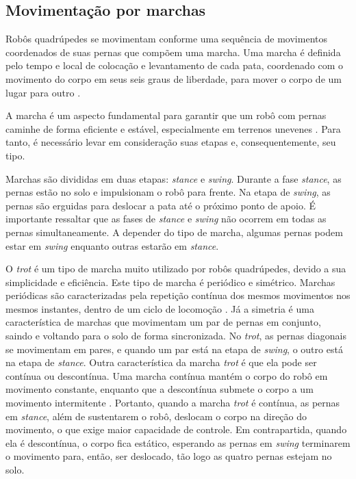 \documentclass[conference]{IEEEtran}
\begin{document}
\subsection{Movimentação por marchas}
Robôs quadrúpedes se movimentam conforme uma sequência de movimentos coordenados de suas pernas que compõem uma marcha. Uma marcha é definida pelo tempo e local de colocação e levantamento de cada pata, coordenado com o movimento do corpo em seus seis graus de liberdade, para mover o corpo de um lugar para outro  \cite{Song1989}.

A marcha é um aspecto fundamental para garantir que um robô com pernas caminhe de forma eficiente e estável, especialmente em terrenos unevenes \cite{X.129}. Para tanto, é necessário levar em consideração suas etapas e, consequentemente, seu tipo.

Marchas são divididas em duas etapas: \textit{stance} e \textit{swing}. Durante a fase \textit{stance}, as pernas estão no solo e impulsionam o robô para frente. Na etapa de \textit{swing}, as pernas são erguidas para deslocar a pata até o próximo ponto de apoio. É importante ressaltar que as fases de \textit{stance} e \textit{swing} não ocorrem em todas as pernas simultaneamente. A depender do tipo de marcha, algumas pernas podem estar em \textit{swing} enquanto outras estarão em \textit{stance}.

O \textit{trot} é um tipo de marcha muito utilizado por robôs quadrúpedes, devido a sua simplicidade e eficiência. Este tipo de marcha é periódico e simétrico. Marchas periódicas são caracterizadas pela repetição contínua dos mesmos movimentos nos mesmos instantes, dentro de um ciclo de locomoção \cite{de2006quadrupedal}. Já a simetria é uma característica de marchas que movimentam um par de pernas em conjunto, saindo e voltando para o solo de forma sincronizada. No \textit{trot}, as pernas diagonais se movimentam em pares, e quando um par está na etapa de \textit{swing}, o outro está na etapa de \textit{stance}. Outra característica da marcha \textit{trot} é que ela pode ser contínua ou descontínua. Uma marcha contínua mantém o corpo do robô em movimento constante, enquanto que a descontínua submete o corpo a um movimento intermitente \cite{de2006quadrupedal}. Portanto, quando a marcha \textit{trot} é contínua, as pernas em \textit{stance}, além de sustentarem o robô, deslocam o corpo na direção do movimento, o que exige maior capacidade de controle. Em contrapartida, quando ela é descontínua, o corpo fica estático, esperando as pernas em \textit{swing} terminarem o movimento para, então, ser deslocado, tão logo as quatro pernas estejam no solo.
\end{document}
